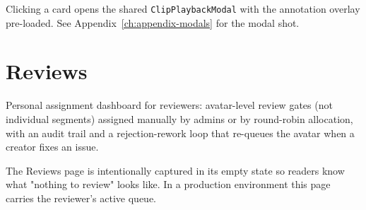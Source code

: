 \begin{itemize}
\end{itemize}


Clicking a card opens the shared \texttt{ClipPlaybackModal} with the annotation
overlay pre-loaded. See Appendix~\ref{ch:appendix-modals} for the modal shot.

\section{Reviews}
\label{sec:reviews}

Personal assignment dashboard for reviewers: avatar-level review gates (not
individual segments) assigned manually by admins or by round-robin allocation,
with an audit trail and a rejection-rework loop that re-queues the avatar when a
creator fixes an issue.


\begin{itemize}
\end{itemize}

\begin{designnote}
The Reviews page is intentionally captured in its empty state so readers
know what "nothing to review" looks like. In a production environment this
page carries the reviewer's active queue.
\end{designnote}
